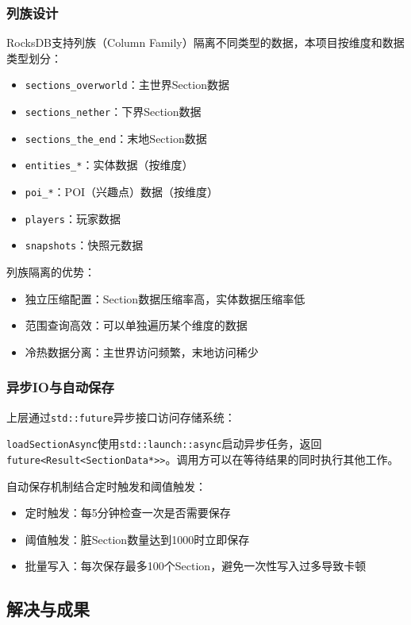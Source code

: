 \subsubsection{列族设计}

RocksDB支持列族（Column Family）隔离不同类型的数据，本项目按维度和数据类型划分：

\begin{itemize}
    \item \texttt{sections\_overworld}：主世界Section数据
    \item \texttt{sections\_nether}：下界Section数据
    \item \texttt{sections\_the\_end}：末地Section数据
    \item \texttt{entities\_*}：实体数据（按维度）
    \item \texttt{poi\_*}：POI（兴趣点）数据（按维度）
    \item \texttt{players}：玩家数据
    \item \texttt{snapshots}：快照元数据
\end{itemize}

列族隔离的优势：
\begin{itemize}
    \item 独立压缩配置：Section数据压缩率高，实体数据压缩率低
    \item 范围查询高效：可以单独遍历某个维度的数据
    \item 冷热数据分离：主世界访问频繁，末地访问稀少
\end{itemize}

\subsubsection{异步IO与自动保存}

上层通过\texttt{std::future}异步接口访问存储系统：

\texttt{loadSectionAsync}使用\texttt{std::launch::async}启动异步任务，返回\texttt{future<Result<SectionData*>>}。调用方可以在等待结果的同时执行其他工作。

自动保存机制结合定时触发和阈值触发：
\begin{itemize}
    \item 定时触发：每5分钟检查一次是否需要保存
    \item 阈值触发：脏Section数量达到1000时立即保存
    \item 批量写入：每次保存最多100个Section，避免一次性写入过多导致卡顿
\end{itemize}

\subsection{解决与成果}


